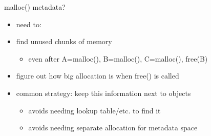 \begin{frame}{malloc() metadata?}
    \begin{itemize}
    \item need to:
    \vspace{.5cm}
    \item find unused chunks of memory
        \begin{itemize}
        \item even after A=malloc(), B=malloc(), C=malloc(), free(B)
        \end{itemize}
    \item figure out how big allocation is when free() is called
    \vspace{.5cm}
    \item common strategy: keep this information next to objects
        \begin{itemize}
        \item avoids needing lookup table/etc. to find it
        \item avoids needing separate allocation for metadata space
        \end{itemize}
    \end{itemize}
\end{frame}

